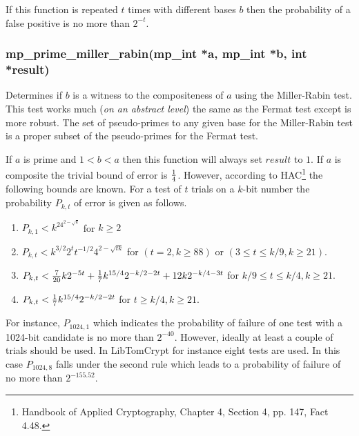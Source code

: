 \documentclass[]{article}
\begin{document}
If this function is repeated $t$ times with different bases $b$ then the probability of a false positive
is no more than $2^{-t}$.

\subsubsection{mp\_prime\_miller\_rabin(mp\_int *a, mp\_int *b, int *result)}
Determines if $b$ is a witness to the compositeness of $a$ using the Miller-Rabin test.  This test
works much (\textit{on an abstract level}) the same as the Fermat test except is more robust.  The
set of pseudo-primes to any given base for the Miller-Rabin test is a proper subset of the pseudo-primes
for the Fermat test.  

If $a$ is prime and $1 < b < a$ then this function will always set $result$ to $1$.  If $a$ is composite
the trivial bound of error is $1 \over 4$.  However, according to HAC\footnote{Handbook of Applied
Cryptography, Chapter 4, Section 4, pp. 147, Fact 4.48.} the following bounds are 
known.  For a test of $t$ trials on a $k$-bit number the probability $P_{k,t}$ of error is given as
follows.

\begin{enumerate}
\item $P_{k,1} < k^24^{2 - \sqrt{k}}$ for $k \ge 2$
\item $P_{k,t} < k^{3/2}2^tt^{-1/2}4^{2-\sqrt{tk}}$ for $(t = 2, k \ge 88)$ or $(3 \le t \le k/9, k \ge 21)$.
\item $P_{k,t} < {7 \over 20}k2^{-5t} + {1 \over 7}k^{15/4}2^{-k/2-2t} + 12k2^{-k/4-3t}$ for $k/9 \le t \le k/4, k \ge 21$.
\item $P_{k,t} < {1 \over 7}k^{15/4}2^{-k/2 - 2t}$  for $t \ge k/4, k \ge 21$.
\end{enumerate}

For instance, $P_{1024,1}$ which indicates the probability of failure of one test with a 1024-bit candidate 
is no more than $2^{-40}$.  However, ideally at least a couple of trials should be used.  In LibTomCrypt
for instance eight tests are used.  In this case $P_{1024,8}$ falls under the second rule which leads
to a probability of failure of no more than $2^{-155.52}$.
\end{document}
